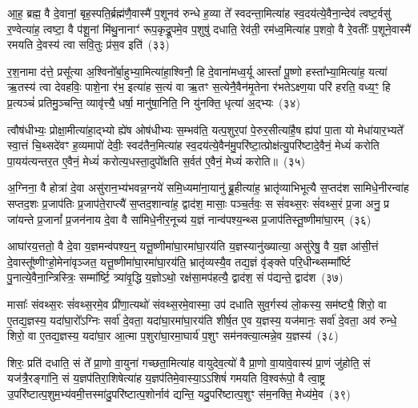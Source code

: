 आ॒ह॒ ब्रह्म॒ वै दे॒वानां॒ बृह॒स्पति॒र्ब्रह्म॑णै॒वास्मै॑ प॒शूनव॑ रुन्धे ह॒व्या ते᳚ स्वदन्ता॒मित्या॑ह स्व॒दय॑त्ये॒वैना॒न्देव॑ त्वष्ट॒र्वसु॑ र॒ण्वेत्या॑ह॒ त्वष्टा॒ वै प॑शू॒नां मि॑थु॒नानाꣳ॑ रूप॒कृद्रू॒पमे॒व प॒शुषु॑ दधाति॒ रेव॑ती॒ रम॑ध्व॒मित्या॑ह प॒शवो॒ वै रे॒वतीः᳚ प॒शूने॒वास्मै॑ रमयति दे॒वस्य॑ त्वा सवि॒तुः प्र॑स॒व इति॑~(३३)

र॒श॒नामा द॑त्ते॒ प्रसू᳚त्या अ॒श्विनो᳚र्बा॒हुभ्या॒मित्या॑हा॒श्विनौ॒ हि दे॒वाना॑मध्व॒र्यू आस्तां᳚ पू॒ष्णो हस्ता᳚भ्या॒मित्या॑ह॒ यत्या॑ ऋ॒तस्य॑ त्वा देवहविः॒ पाशे॒ना र॑भ॒ इत्या॑ह स॒त्यं वा ऋ॒तꣳ स॒त्येनै॒वैन॑मृ॒तेना र॑भते\-ऽक्ष्ण॒या परि॑ हरति॒ वध्य॒ꣳ॒ हि प्र॒त्यञ्चं॑ प्रतिमु॒ञ्चन्ति॒ व्यावृ॑त्त्यै॒ धर्\mbox{}षा॒ मानु॑षा॒निति॒ नि यु॑नक्ति॒ धृत्या॑ अ॒द्भ्यः~(३४)

त्वौष॑धीभ्यः॒ प्रोक्षा॒मीत्या॑हा॒द्भ्यो ह्ये॑ष ओष॑धीभ्यः स॒म्भव॑ति॒ यत्प॒शुर॒पां पे॒रुर॒सीत्या॑है॒ष ह्य॑पां पा॒ता यो मेधा॑यार॒भ्यते᳚ स्वा॒त्तं चि॒थ्सदे॑वꣳ ह॒व्यमापो॑ देवीः॒ स्वद॑तैन॒मित्या॑ह स्व॒दय॑त्ये॒वैन॑मु॒परि॑ष्टा॒त्प्रोक्ष॑त्यु॒परि॑ष्टादे॒वैनं॒ मेध्यं॑ करोति पा॒यय॑त्यन्तर॒त ए॒वैनं॒ मेध्यं॑ करोत्य॒धस्ता॒दुपो᳚क्षति स॒र्वत॑ ए॒वैनं॒ मेध्यं॑ करोति॥~(३५)

{\anuvakamend[{वसू॒निति॑ प्रस॒व इत्य॒द्भ्यो᳚\-ऽन्तर॒त ए॒वैन॒न्दश॑ च}]}%

अ॒ग्निना॒ वै होत्रा॑ दे॒वा असु॑रान॒भ्य॑भवन्न॒ग्नये॑ समि॒ध्यमा॑ना॒यानु॑ ब्रू॒हीत्या॑ह॒ भ्रातृ॑व्याभिभूत्यै स॒प्तद॑श सामिधे॒नीरन्वा॑ह सप्तद॒शः प्र॒जा\-प॑तिः प्र॒जा\-प॑ते॒राप्त्यै॑ स॒प्तद॒शान्वा॑ह॒ द्वाद॑श॒ मासाः॒ पञ्च॒र्तवः॒ स सं॑वथ्स॒रः सं॑वथ्स॒रं प्र॒जा अनु॒ प्र जा॑यन्ते प्र॒जानां᳚ प्र॒जन॑नाय दे॒वा वै सा॑मिधे॒नीर॒नूच्य॑ य॒ज्ञं नान्व॑पश्य॒न्थ्स प्र॒जा\-प॑तिस्तू॒ष्णीमा॑घा॒रम्~(३६)

आघा॑रय॒त्ततो॒ वै दे॒वा य॒ज्ञमन्व॑पश्य॒न्॒ यत्तू॒ष्णीमा॑घा॒रमा॑घा॒रय॑ति य॒ज्ञस्यानु॑ख्यात्या॒ असु॑रेषु॒ वै य॒ज्ञ आ॑सी॒त्तं दे॒वास्तू᳚ष्णीꣳहो॒मेना॑वृञ्जत॒ यत्तू॒ष्णीमा॑घा॒रमा॑घा॒रय॑ति॒ भ्रातृ॑व्यस्यै॒व तद्य॒ज्ञं वृ॑ङ्क्ते परि॒धीन्थ्सम्मा᳚र्ष्टि पु॒नात्ये॒वैना॒न्त्रिस्त्रिः॒ सम्मा᳚र्ष्टि॒ त्र्या॑वृ॒द्धि य॒ज्ञो\-ऽथो॒ रक्ष॑सा॒मप॑हत्यै॒ द्वाद॑श॒ सं प॑द्यन्ते॒ द्वाद॑श~(३७)

मासाः᳚ संवथ्स॒रः सं॑वथ्स॒रमे॒व प्री॑णा॒त्यथो॑ संवथ्स॒रमे॒वास्मा॒ उप॑ दधाति सुव॒र्गस्य॑ लो॒कस्य॒ सम॑ष्ट्यै॒ शिरो॒ वा ए॒तद्य॒ज्ञस्य॒ यदा॑घा॒रो᳚\-ऽग्निः सर्वा॑ दे॒वता॒ यदा॑घा॒रमा॑घा॒रय॑ति शीर्\mbox{}ष॒त ए॒व य॒ज्ञस्य॒ यज॑मानः॒ सर्वा॑ दे॒वता॒ अव॑ रुन्धे॒ शिरो॒ वा ए॒तद्य॒ज्ञस्य॒ यदा॑घा॒र आ॒त्मा प॒शुरा॑घा॒रमा॒घार्य॑ प॒शुꣳ सम॑नक्त्या॒त्मन्ने॒व य॒ज्ञस्य॑~(३८)

शिरः॒ प्रति॑ दधाति॒ सं ते᳚ प्रा॒णो वा॒युना॑ गच्छता॒मित्या॑ह वायुदेव॒त्यो॑ वै प्रा॒णो वा॒यावे॒वास्य॑ प्रा॒णं जु॑होति॒ सं यज॑त्रै॒रङ्गा॑नि॒ सं य॒ज्ञप॑तिरा॒शिषेत्या॑ह य॒ज्ञप॑तिमे॒वास्या॒\-ऽऽ\-शिषं॑ गमयति वि॒श्वरू॑पो॒ वै त्वा॒ष्ट्र उ॒परि॑ष्टात्प॒शुम॒भ्य॑वमी॒त्तस्मा॑दु॒परि॑ष्टात्प॒शोर्नाव॑ द्यन्ति॒ यदु॒परि॑ष्टात्प॒शुꣳ स॑म॒नक्ति॒ मेध्य॑मे॒व~(३९)

